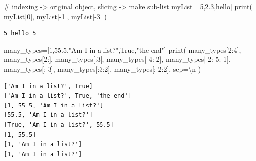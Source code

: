 \documentclass[
  letterpaper,
  DIV=11,
  numbers=noendperiod]{scrreprt}
\newenvironment{Shaded}{\begin{snugshade}}{\end{snugshade}}
\newcommand{\BuiltInTok}[1]{\textcolor[rgb]{0.00,0.23,0.31}{#1}}
\newcommand{\CharTok}[1]{\textcolor[rgb]{0.13,0.47,0.30}{#1}}
\newcommand{\CommentTok}[1]{\textcolor[rgb]{0.37,0.37,0.37}{#1}}
\newcommand{\DecValTok}[1]{\textcolor[rgb]{0.68,0.00,0.00}{#1}}
\newcommand{\FloatTok}[1]{\textcolor[rgb]{0.68,0.00,0.00}{#1}}
\newcommand{\NormalTok}[1]{\textcolor[rgb]{0.00,0.23,0.31}{#1}}
\newcommand{\OperatorTok}[1]{\textcolor[rgb]{0.37,0.37,0.37}{#1}}
\newcommand{\StringTok}[1]{\textcolor[rgb]{0.13,0.47,0.30}{#1}}
\newcommand{\VariableTok}[1]{\textcolor[rgb]{0.07,0.07,0.07}{#1}}
\begin{document}
\begin{Shaded}
\begin{Highlighting}[]
\CommentTok{\# indexing {-}\textgreater{} original object, slicing {-}\textgreater{} make sub{-}list}
\NormalTok{myList}\OperatorTok{=}\NormalTok{[}\DecValTok{5}\NormalTok{,}\FloatTok{2.3}\NormalTok{,}\StringTok{\textquotesingle{}hello\textquotesingle{}}\NormalTok{]}
\BuiltInTok{print}\NormalTok{(}
\NormalTok{    myList[}\DecValTok{0}\NormalTok{],}
\NormalTok{    myList[}\OperatorTok{{-}}\DecValTok{1}\NormalTok{],}
\NormalTok{    myList[}\OperatorTok{{-}}\DecValTok{3}\NormalTok{]}
\NormalTok{)}
\end{Highlighting}
\end{Shaded}

\begin{verbatim}
5 hello 5
\end{verbatim}

\begin{Shaded}
\begin{Highlighting}[]
\NormalTok{many\_types}\OperatorTok{=}\NormalTok{[}\DecValTok{1}\NormalTok{,}\FloatTok{55.5}\NormalTok{,}\StringTok{"Am I in a list?"}\NormalTok{,}\VariableTok{True}\NormalTok{,}\StringTok{"the end"}\NormalTok{]}
\BuiltInTok{print}\NormalTok{(}
\NormalTok{    many\_types[}\DecValTok{2}\NormalTok{:}\DecValTok{4}\NormalTok{],}
\NormalTok{    many\_types[}\DecValTok{2}\NormalTok{:],}
\NormalTok{    many\_types[:}\DecValTok{3}\NormalTok{],}
\NormalTok{    many\_types[}\OperatorTok{{-}}\DecValTok{4}\NormalTok{:}\OperatorTok{{-}}\DecValTok{2}\NormalTok{],}
\NormalTok{    many\_types[}\OperatorTok{{-}}\DecValTok{2}\NormalTok{:}\OperatorTok{{-}}\DecValTok{5}\NormalTok{:}\OperatorTok{{-}}\DecValTok{1}\NormalTok{],}
\NormalTok{    many\_types[:}\OperatorTok{{-}}\DecValTok{3}\NormalTok{],}
\NormalTok{    many\_types[:}\DecValTok{3}\NormalTok{:}\DecValTok{2}\NormalTok{],}
\NormalTok{    many\_types[:}\OperatorTok{{-}}\DecValTok{2}\NormalTok{:}\DecValTok{2}\NormalTok{],}
\NormalTok{    sep}\OperatorTok{=}\StringTok{\textquotesingle{}}\CharTok{\textbackslash{}n}\StringTok{\textquotesingle{}}
\NormalTok{)}
\end{Highlighting}
\end{Shaded}

\begin{verbatim}
['Am I in a list?', True]
['Am I in a list?', True, 'the end']
[1, 55.5, 'Am I in a list?']
[55.5, 'Am I in a list?']
[True, 'Am I in a list?', 55.5]
[1, 55.5]
[1, 'Am I in a list?']
[1, 'Am I in a list?']
\end{verbatim}
\end{document}
